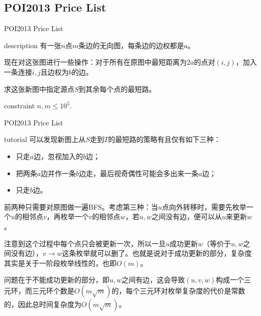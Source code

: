 \documentclass{beamer}
\begin{document}
\subsection{POI2013 Price List}
\begin{frame}{POI2013 Price List}
	\begin{block}{description}
		有一张$n$点$m$条边的无向图，每条边的边权都是$a$。
		
		现在对这张图进行一些操作：对于所有在原图中最短距离为$2a$的点对$(i, j)$，加入一条连接$i, j$且边权为$b$的边。
		
		求这张新图中指定源点$S$到其余每个点的最短路。
	\end{block}
	\begin{block}{constraint}
		$n, m \le 10^5.$
	\end{block}
\end{frame}
\begin{frame}{POI2013 Price List}
	\begin{block}{tutorial}
		可以发现新图上从$S$走到$T$的最短路的策略有且仅有如下三种：
		\begin{itemize}
			\item 只走$a$边，忽视加入的$b$边；
			\item 把两条$a$边并作一条$b$边走，最后视奇偶性可能会多出来一条$a$边；
			\item 只走$b$边。
		\end{itemize}
	
		前两种只需要对原图做一遍BFS。考虑第三种：当$u$点向外转移时，需要先枚举一个$u$的相邻点$v$，再枚举一个$v$的相邻点$w$，若$u, w$之间没有边，便可以从$u$来更新$w$。
		
		注意到这个过程中每个点只会被更新一次，所以一旦$u$成功更新$w$（等价于$u, w$之间没有边），$v \to w$这条枚举就可以删了。也就是说对于成功更新的部分，复杂度其实是关于一阶段枚举线性的，也即$O(m)$。
		
		问题在于不能成功更新的部分，即$u, w$之间有边，这会导致$(u, v, w)$构成一个三元环，而三元环个数是$O(m\sqrt m)$的，每个三元环对枚举复杂度的代价是常数的，因此总时间复杂度为$O(m\sqrt m)$。
	\end{block}
\end{frame}
\end{document}
